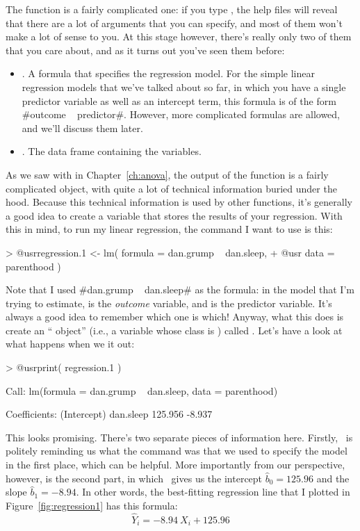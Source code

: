 The  function is a fairly complicated one: if you type , the help files will reveal that there are a lot of arguments that you can specify, and most of them won't make a lot of sense to you. At this stage however, there's really only two of them that you care about, and as it turns out you've seen them before:
\begin{itemize}
\item {}. A formula that specifies the regression model. For the simple linear regression models that we've talked about so far, in which you have a single predictor variable as well as an intercept term, this formula is of the form \rtextverb#outcome ~ predictor#. However, more complicated formulas are allowed, and we'll discuss them later.
\item {}. The data frame containing the variables.
\end{itemize}
As we saw with  in Chapter~\ref{ch:anova}, the output of the  function is a fairly complicated object, with quite a lot of technical information buried under the hood. Because this technical information is used by other functions, it's generally a good idea to create a variable that stores the results of your regression. With this in mind, to run my linear regression, the command I want to use is this:
\begin{rblock1}
> @usr{regression.1 <- lm( formula = dan.grump ~ dan.sleep,}  
+ @usr{                    data = parenthood )}  
\end{rblock1}
Note that I used \rtextverb#dan.grump ~ dan.sleep# as the formula: in the model that I'm trying to estimate,  is the {\it outcome} variable, and  is the predictor variable. It's always a good idea to remember which one is which! Anyway, what this does is create an `` object'' (i.e., a variable whose class is ) called . Let's have a look at what happens when we  it out:
\begin{rblock1}
> @usr{print( regression.1 )}

Call:
lm(formula = dan.grump ~ dan.sleep, data = parenthood)

Coefficients:
(Intercept)    dan.sleep  
    125.956       -8.937  
\end{rblock1}
This looks promising. There's two separate pieces of information here. Firstly, \R\ is politely reminding us what the command was that we used to specify the model in the first place, which can be helpful. More importantly from our perspective, however, is the second part, in which \R\ gives us the intercept $\hat{b}_0 = 125.96$ and the slope $\hat{b}_1 = -8.94$. In other words, the best-fitting regression line that I plotted in Figure~\ref{fig:regression1} has this formula:
$$
\hat{Y}_i = -8.94 \ X_i + 125.96
$$ 

